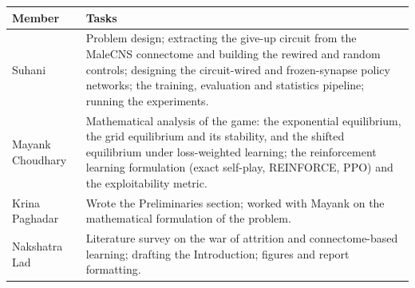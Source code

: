 \documentclass{article}
\begin{document}
\begin{table}[h]
\centering
\begin{tabular}{lp{11.5cm}}
\toprule
Member & Tasks \\
\midrule
Suhani & Problem design; extracting the give-up circuit from the MaleCNS connectome and building the rewired and random controls; designing the circuit-wired and frozen-synapse policy networks; the training, evaluation and statistics pipeline; running the experiments. \\
\addlinespace
Mayank Choudhary & Mathematical analysis of the game: the exponential equilibrium, the grid equilibrium and its stability, and the shifted equilibrium under loss-weighted learning; the reinforcement learning formulation (exact self-play, REINFORCE, PPO) and the exploitability metric. \\
\addlinespace
Krina Paghadar & Wrote the Preliminaries section; worked with Mayank on the mathematical formulation of the problem. \\
\addlinespace
Nakshatra Lad & Literature survey on the war of attrition and connectome-based learning; drafting the Introduction; figures and report formatting. \\
\bottomrule
\end{tabular}
\end{table}



\end{document}
